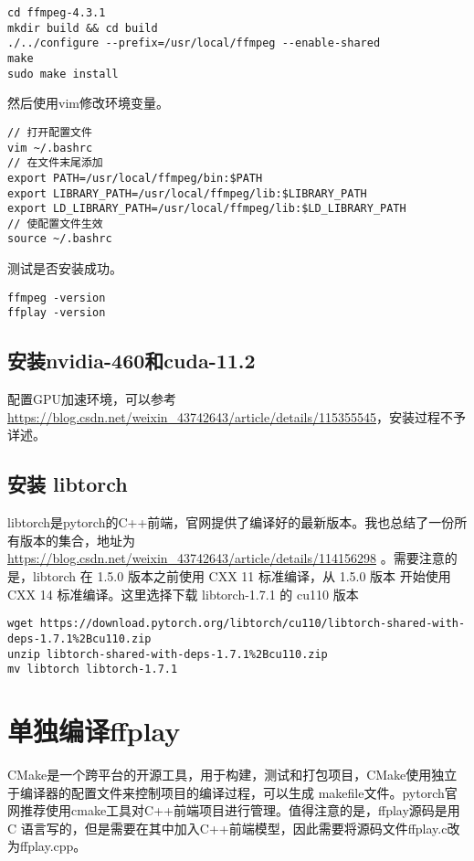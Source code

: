 \begin{lstlisting}
cd ffmpeg-4.3.1
mkdir build && cd build
./../configure --prefix=/usr/local/ffmpeg --enable-shared
make
sudo make install
\end{lstlisting}

然后使用vim修改环境变量。

\begin{lstlisting}
// 打开配置文件
vim ~/.bashrc
// 在文件末尾添加
export PATH=/usr/local/ffmpeg/bin:$PATH
export LIBRARY_PATH=/usr/local/ffmpeg/lib:$LIBRARY_PATH
export LD_LIBRARY_PATH=/usr/local/ffmpeg/lib:$LD_LIBRARY_PATH
// 使配置文件生效
source ~/.bashrc
\end{lstlisting}

测试是否安装成功。

\begin{lstlisting}
ffmpeg -version
ffplay -version
\end{lstlisting}

\subsection{安装nvidia-460和cuda-11.2}

配置GPU加速环境，可以参考 \url{https://blog.csdn.net/weixin_43742643/article/details/115355545}，安装过程不予详述。

\subsection{安装 libtorch}

libtorch是pytorch的C++前端，官网提供了编译好的最新版本。我也总结了一份所有版本的集合，地址为 
\url{https://blog.csdn.net/weixin_43742643/article/details/114156298}
。需要注意的是，libtorch 在 1.5.0 版本之前使用 CXX 11 标准编译，从 1.5.0 版本
开始使用 CXX 14 标准编译。这里选择下载 libtorch-1.7.1 的 cu110 版本

\begin{lstlisting}
wget https://download.pytorch.org/libtorch/cu110/libtorch-shared-with-deps-1.7.1%2Bcu110.zip
unzip libtorch-shared-with-deps-1.7.1%2Bcu110.zip
mv libtorch libtorch-1.7.1
\end{lstlisting}

\section{单独编译ffplay}

CMake是一个跨平台的开源工具，用于构建，测试和打包项目，CMake使用独立于编译器的配置文件来控制项目的编译过程，可以生成
makefile文件。pytorch官网推荐使用cmake工具对C++前端项目进行管理。值得注意的是，ffplay源码是用C
语言写的，但是需要在其中加入C++前端模型，因此需要将源码文件ffplay.c改为ffplay.cpp。

